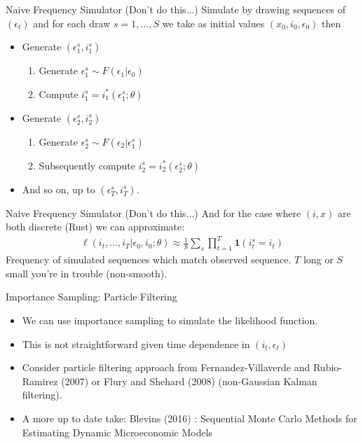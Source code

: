 \begin{frame}{Naive Frequency Simulator (Don't do this...)}
Simulate by drawing sequences of $(\epsilon_t)$ and for each draw $s=1,\ldots,S$ we take as initial values $(x_0,i_0,\epsilon_0)$ then
\begin{itemize}
\item Generate $(\epsilon_1^s, i_1^s)$
	\begin{enumerate}
	\item Generate $\epsilon_1^s \sim F(\epsilon_1 | \epsilon_0)$ 
	\item Compute $i_1^s = i_1^{*}(\epsilon_1^s; \theta)$
	\end{enumerate}
\item Generate $(\epsilon_2^s, i_2^s)$
	\begin{enumerate}
	\item Generate $\epsilon_2^s \sim F(\epsilon_2 | \epsilon_1^s)$ 
	\item Subsequently compute $i_2^s = i_2^{*}(\epsilon_2^s; \theta)$
	\end{enumerate}
\item And so on, up to $(\epsilon_T^s,i_T^s)$.
\end{itemize}
\end{frame}


\begin{frame}{Naive Frequency Simulator (Don't do this...)}
And for the case where $(i,x)$ are both discrete (Rust) we can approximate:
\vspace{-0.5cm}
\begin{eqnarray*}
\ell(i_t,\ldots,i_T | \epsilon_0,i_0;\theta) \approx \frac{1}{S} \sum_s \prod_{t=1}^T \mathbf{1}(i_t^s = i_t)
\end{eqnarray*}
Frequency of simulated sequences which match observed sequence.  $T$ long or $S$ small you're in trouble (non-smooth).
\end{frame}



\begin{frame}{Importance Sampling: Particle Filtering}
\begin{itemize}
\item We can use importance sampling to simulate the likelihood function. 
\item This is not straightforward given time dependence in $(i_t,\epsilon_t)$
\item Consider particle filtering approach from Fernandez-Villaverde and Rubio-Ramirez (2007) or Flury and Shehard (2008) (non-Gaussian Kalman filtering).
\item A more up to date take: Blevins (2016) : Sequential {Monte Carlo} Methods for Estimating Dynamic Microeconomic Models
\end{itemize}
\end{frame}

